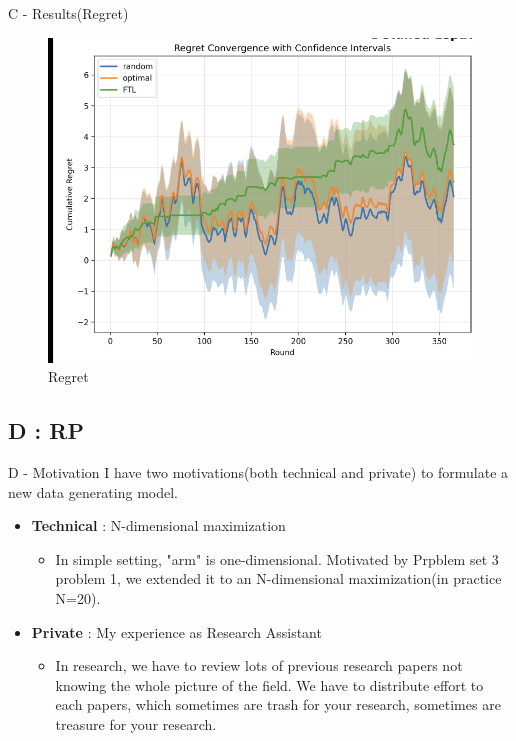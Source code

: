 \documentclass{beamer}
\begin{document}
\begin{frame}{C - Results(Regret)}
\begin{figure}
    \centering
    \includegraphics[width=0.5\linewidth]{332Project2//figures/Regret.png}
    \caption{Regret}
    \label{fig:placeholder}
\end{figure}
    
\end{frame}


\subsection{D : RP}

\begin{frame}{D - Motivation}
I have two motivations(both technical and private) to formulate a new data generating model.
    \begin{itemize}
        \item \textbf{Technical} : N-dimensional maximization
        \begin{itemize}
            \item In simple setting, "arm" is one-dimensional. Motivated by Prpblem set 3 problem 1, we extended it to an N-dimensional maximization(in practice N=20).
        \end{itemize}
        \item \textbf{Private} : My experience as Research Assistant
        \begin{itemize}
            \item In research, we have to review lots of previous research papers not knowing the whole picture of the field. We have to distribute effort to each papers, which sometimes are trash for your research, sometimes are treasure for your research.
        \end{itemize}
    \end{itemize}
\end{frame}
\end{document}

